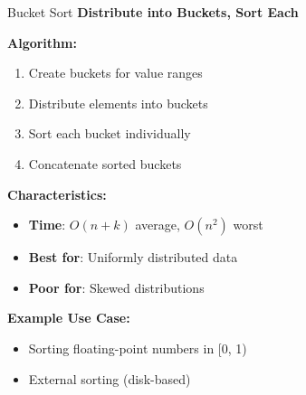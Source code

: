 \documentclass[aspectratio=169]{beamer}
\begin{document}
\begin{frame}{Bucket Sort}
  \textbf{Distribute into Buckets, Sort Each}

  \vspace{0.3cm}
  \textbf{Algorithm:}
  \begin{enumerate}
    \item Create buckets for value ranges
    \item Distribute elements into buckets
    \item Sort each bucket individually
    \item Concatenate sorted buckets
  \end{enumerate}

  \vspace{0.3cm}
  \textbf{Characteristics:}
  \begin{itemize}
    \item \textbf{Time}: $O(n + k)$ average, $O(n^2)$ worst
    \item \textbf{Best for}: Uniformly distributed data
    \item \textbf{Poor for}: Skewed distributions
  \end{itemize}

  \vspace{0.3cm}
  \textbf{Example Use Case:}
  \begin{itemize}
    \item Sorting floating-point numbers in [0, 1)
    \item External sorting (disk-based)
  \end{itemize}
\end{frame}
\end{document}
